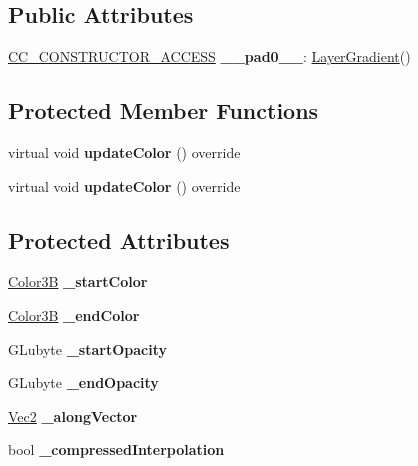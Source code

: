 \subsection*{Public Attributes}
\begin{DoxyCompactItemize}
\item 
\mbox{\label{classLayerGradient_a3f746a3a8e2135f1c02b4b12261b8a85}} 
\hyperlink{_2cocos2d_2cocos_2base_2ccConfig_8h_a25ef1314f97c35a2ed3d029b0ead6da0}{C\+C\+\_\+\+C\+O\+N\+S\+T\+R\+U\+C\+T\+O\+R\+\_\+\+A\+C\+C\+E\+SS} {\bfseries \+\_\+\+\_\+pad0\+\_\+\+\_\+}\+: \hyperlink{classLayerGradient}{Layer\+Gradient}()
\end{DoxyCompactItemize}
\subsection*{Protected Member Functions}
\begin{DoxyCompactItemize}
\item 
\mbox{\label{classLayerGradient_a21ae534cdb7143bf25bd28f45e4309f7}} 
virtual void {\bfseries update\+Color} () override
\item 
\mbox{\label{classLayerGradient_ab95811d9dd3cfe6b75e9606bb93af2a9}} 
virtual void {\bfseries update\+Color} () override
\end{DoxyCompactItemize}
\subsection*{Protected Attributes}
\begin{DoxyCompactItemize}
\item 
\mbox{\label{classLayerGradient_a0154b0e5e65d0cf33bb072e89628a096}} 
\hyperlink{structColor3B}{Color3B} {\bfseries \+\_\+start\+Color}
\item 
\mbox{\label{classLayerGradient_a5abc8e9e926722ea80966bef2273de9c}} 
\hyperlink{structColor3B}{Color3B} {\bfseries \+\_\+end\+Color}
\item 
\mbox{\label{classLayerGradient_a8a36f6ccb24c70c03128f6f5ca1464fa}} 
G\+Lubyte {\bfseries \+\_\+start\+Opacity}
\item 
\mbox{\label{classLayerGradient_a87e977b66007bb916c35a730c68532d1}} 
G\+Lubyte {\bfseries \+\_\+end\+Opacity}
\item 
\mbox{\label{classLayerGradient_ad2fde41ee0b2f0de30ca852407e74d9f}} 
\hyperlink{classVec2}{Vec2} {\bfseries \+\_\+along\+Vector}
\item 
\mbox{\label{classLayerGradient_a55e6524324ad42458e39c6589def8099}} 
bool {\bfseries \+\_\+compressed\+Interpolation}
\end{DoxyCompactItemize}

